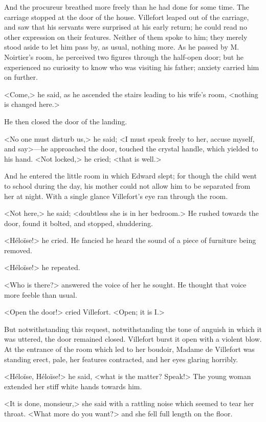  And the procureur breathed more freely than he had done for some time.  The carriage stopped at the door of the house. Villefort leaped out of the carriage, and saw that his servants were surprised at his early return; he could read no other expression on their features. Neither of them spoke to him; they merely stood aside to let him pass by, as usual, nothing more. As he passed by M. Noirtier's room, he perceived two figures through the half-open door; but he experienced no curiosity to know who was visiting his father; anxiety carried him on further. 

 <Come,> he said, as he ascended the stairs leading to his wife's room, <nothing is changed here.> 

 He then closed the door of the landing. 

 <No one must disturb us,> he said; <I must speak freely to her, accuse myself, and say>—he approached the door, touched the crystal handle, which yielded to his hand. <Not locked,> he cried; <that is well.> 

 And he entered the little room in which Edward slept; for though the child went to school during the day, his mother could not allow him to be separated from her at night. With a single glance Villefort's eye ran through the room. 

 <Not here,> he said; <doubtless she is in her bedroom.> He rushed towards the door, found it bolted, and stopped, shuddering. 

 <Héloïse!> he cried. He fancied he heard the sound of a piece of furniture being removed. 

 <Héloïse!> he repeated. 

 <Who is there?> answered the voice of her he sought. He thought that voice more feeble than usual. 

 <Open the door!> cried Villefort. <Open; it is I.> 

 But notwithstanding this request, notwithstanding the tone of anguish in which it was uttered, the door remained closed. Villefort burst it open with a violent blow. At the entrance of the room which led to her boudoir, Madame de Villefort was standing erect, pale, her features contracted, and her eyes glaring horribly. 

 <Héloïse, Héloïse!> he said, <what is the matter? Speak!> The young woman extended her stiff white hands towards him. 

 <It is done, monsieur,> she said with a rattling noise which seemed to tear her throat. <What more do you want?> and she fell full length on the floor. 

